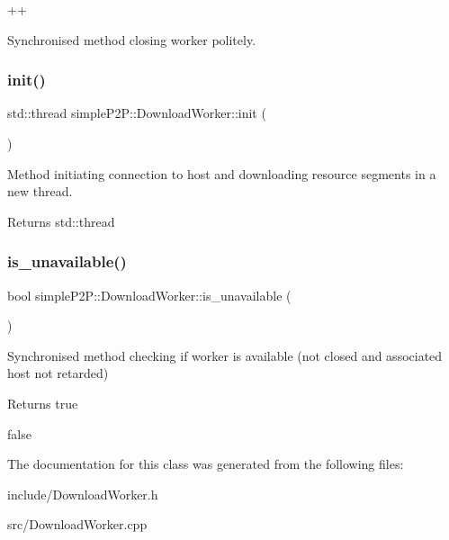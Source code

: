 ++ 

Synchronised method closing worker politely. \mbox{\label{classsimpleP2P_1_1DownloadWorker_aedf77c7a4944beaee84494c83512551b}} 
\subsubsection{\texorpdfstring{init()}{init()}}
{\footnotesize\ttfamily std\+::thread simple\+P2\+P\+::\+Download\+Worker\+::init (\begin{DoxyParamCaption}{ }\end{DoxyParamCaption})}



Method initiating connection to host and downloading resource segments in a new thread. 

\begin{DoxyReturn}{Returns}
std\+::thread 
\end{DoxyReturn}
\mbox{\label{classsimpleP2P_1_1DownloadWorker_a73743cf5fe1e579bc7cf0e5acb504450}} 
\subsubsection{\texorpdfstring{is\+\_\+unavailable()}{is\_unavailable()}}
{\footnotesize\ttfamily bool simple\+P2\+P\+::\+Download\+Worker\+::is\+\_\+unavailable (\begin{DoxyParamCaption}{ }\end{DoxyParamCaption})}



Synchronised method checking if worker is available (not closed and associated host not retarded) 

\begin{DoxyReturn}{Returns}
true 

false 
\end{DoxyReturn}


The documentation for this class was generated from the following files\+:\begin{DoxyCompactItemize}
\item 
include/Download\+Worker.\+h\item 
src/Download\+Worker.\+cpp\end{DoxyCompactItemize}
